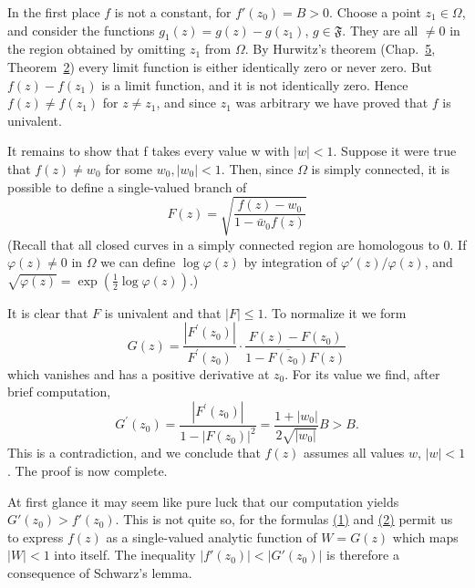 In the first place $f$ is not a constant, for $f'(z_0) = B > 0$. Choose a point $z_1 \in \Omega$, and consider the functions $g_1(z) = g(z) - g(z_1)$, $g \in \mathfrak{F}$. They are all $\neq 0$ in the region obtained by omitting $z_1$ from $\Omega$. By Hurwitz's theorem (Chap.~\hyperref[chap:5]{5}, Theorem~\hyperref[thm:5.2]{2}) every limit function is either identically zero or never zero. But $f(z) - f(z_1)$ is a limit function, and it is not identically zero. Hence $f(z) \neq f(z_1)$ for $z \neq z_1$, and since $z_1$ was arbitrary we have proved that $f$ is univalent.

It remains to show that f takes every value w with $|w| < 1$. Suppose it were true that $f(z) \neq w_{0}$ for some $w_{0}, |w_{0}| < 1$. Then, since $\Omega$ is simply connected, it is possible to define a single-valued branch of
\begin{equation*}
F (z) = \sqrt {\frac {f (z) - w _ {0}}{1 - \bar {w} _ {0} f (z)}}\tag{1}\label{eq:6.1}
\end{equation*}
(Recall that all closed curves in a simply connected region are homologous to 0. If $\varphi(z) \neq 0$ in $\Omega$ we can define $\log \varphi(z)$ by integration of $\varphi'(z)/\varphi(z)$, and $\sqrt{\varphi(z)} = \exp\left(\frac{1}{2} \log \varphi(z)\right)$.)

It is clear that $F$ is univalent and that $|F| \leq 1$. To normalize it we form
\begin{equation*}
G (z) = \frac {\left| F ^ {\prime} (z _ {0}) \right|}{F ^ {\prime} (z _ {0})} \cdot \frac {F (z) - F (z _ {0})}{1 - \overline {{F (z _ {0})}} F (z)}\tag{2}\label{eq:6.2}
\end{equation*}
which vanishes and has a positive derivative at $z_{0}$. For its value we find, after brief computation,
\begin{equation*}
G ^ {\prime} (z _ {0}) = \frac {| F ^ {\prime} (z _ {0}) |}{1 - | F (z _ {0}) | ^ {2}} = \frac {1 + | w _ {0} |}{2 \sqrt {| w _ {0} |}} B > B.
\end{equation*}
This is a contradiction, and we conclude that $f(z)$ assumes all values $w$, $|w| < 1$. The proof is now complete.

At first glance it may seem like pure luck that our computation yields $G'(z_{0}) > f'(z_{0})$. This is not quite so, for the formulas \hyperref[eq:6.1]{(1)} and \hyperref[eq:6.2]{(2)} permit us to express $f(z)$ as a single-valued analytic function of $W = G(z)$ which maps $|W| < 1$ into itself. The inequality $|f'(z_{0})| < |G'(z_{0})|$ is therefore a consequence of Schwarz's lemma.

